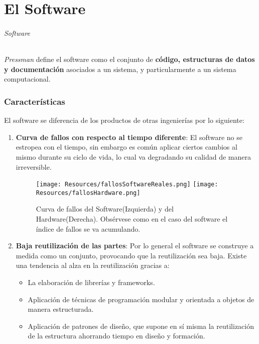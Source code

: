 \part{El Software}
\paragraph{Software}
\textit{Pressman} define el software como el conjunto de \textbf{código, estructuras de datos y documentación} asociados a un sistema, y particularmente a un sistema computacional.

\section{Características}
El software se diferencia de los productos de otras ingenierías por lo siguiente:
\begin{enumerate}

    \item \textbf{Curva de fallos con respecto al tiempo diferente}:
          El software no se estropea con el tiempo, sin embargo es común aplicar ciertos cambios al mismo durante su ciclo de vida, lo cual va degradando su calidad de manera irreversible.
          \begin{figure}[h]
              \centering
              \texttt{[image: Resources/fallosSoftwareReales.png]}
              \texttt{[image: Resources/fallosHardware.png]}
              \caption{Curva de fallos del Software(Izquierda) y del Hardware(Derecha). Obsérvese como en el caso del software el índice de fallos se va acumulando.}
          \end{figure}
    \item \textbf{Baja reutilización de las partes}:
          Por lo general el software se construye a medida como un conjunto, provocando que la reutilización sea baja. Existe una tendencia al alza en la reutilización gracias a:
          \begin{itemize}
              \item La elaboración de librerías y frameworks.
              \item Aplicación de técnicas de programación modular y orientada a objetos de manera estructurada.
              \item Aplicación de patrones de diseño, que supone en sí misma la reutilización de la estructura ahorrando tiempo en diseño y formación.
          \end{itemize}
\end{enumerate}


